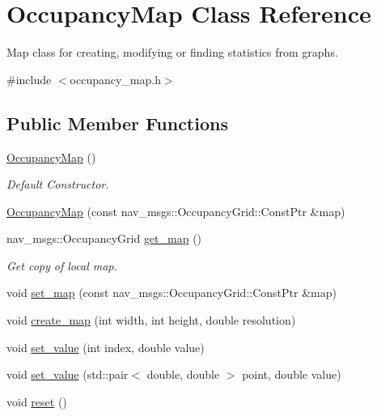 \hypertarget{classOccupancyMap}{\section{Occupancy\-Map Class Reference}
\label{classOccupancyMap}
}


Map class for creating, modifying or finding statistics from graphs.  




{\ttfamily \#include $<$occupancy\-\_\-map.\-h$>$}

\subsection*{Public Member Functions}
\begin{DoxyCompactItemize}
\item 
\hypertarget{classOccupancyMap_ada3a7ee4c7039ae8a8eeb6f8b59df2a9}{\hyperlink{classOccupancyMap_ada3a7ee4c7039ae8a8eeb6f8b59df2a9}{Occupancy\-Map} ()}\label{classOccupancyMap_ada3a7ee4c7039ae8a8eeb6f8b59df2a9}

\begin{DoxyCompactList}\small\item\em Default Constructor. \end{DoxyCompactList}\item 
\hyperlink{classOccupancyMap_a29d5ee8d5c52daf99c9295e0e1a93233}{Occupancy\-Map} (const nav\-\_\-msgs\-::\-Occupancy\-Grid\-::\-Const\-Ptr \&map)
\item 
\hypertarget{classOccupancyMap_a16b23a3ba25e6d9b138d663cafbb4703}{nav\-\_\-msgs\-::\-Occupancy\-Grid \hyperlink{classOccupancyMap_a16b23a3ba25e6d9b138d663cafbb4703}{get\-\_\-map} ()}\label{classOccupancyMap_a16b23a3ba25e6d9b138d663cafbb4703}

\begin{DoxyCompactList}\small\item\em Get copy of local map. \end{DoxyCompactList}\item 
void \hyperlink{classOccupancyMap_a5a9f9ce31d25abb53a9cf6b2a045479e}{set\-\_\-map} (const nav\-\_\-msgs\-::\-Occupancy\-Grid\-::\-Const\-Ptr \&map)
\item 
void \hyperlink{classOccupancyMap_abb7b3ce1c12f73ab28bcb7e595d053d8}{create\-\_\-map} (int width, int height, double resolution)
\item 
void \hyperlink{classOccupancyMap_abcfb41a41d6d19bd90efc11b2536a14d}{set\-\_\-value} (int index, double value)
\item 
void \hyperlink{classOccupancyMap_aed3bec0b57e4a30f252486d4a6eef24c}{set\-\_\-value} (std\-::pair$<$ double, double $>$ point, double value)
\item 
\hypertarget{classOccupancyMap_a063bb55cb8e561c18f519697a77beeea}{void \hyperlink{classOccupancyMap_a063bb55cb8e561c18f519697a77beeea}{reset} ()}\label{classOccupancyMap_a063bb55cb8e561c18f519697a77beeea}


\end{DoxyCompactItemize}
